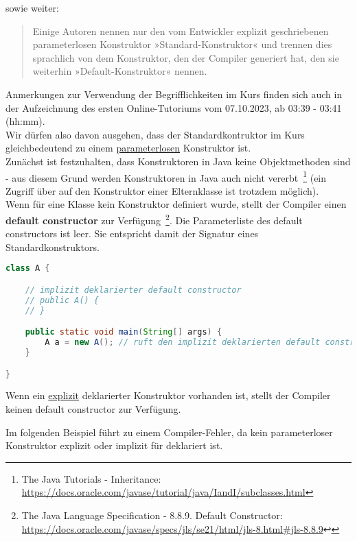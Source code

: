 sowie weiter:

\blockquote[{\cite[517]{Ull12}}]{
    Einige Autoren nennen nur den vom Entwickler explizit geschriebenen parameterlosen Konstruktor »Standard-Konstruktor«
    und trennen dies sprachlich von dem Konstruktor, den der Compiler generiert hat, den sie weiterhin »Default-Konstruktor« nennen.
}

Anmerkungen zur Verwendung der Begrifflichkeiten im Kurs finden sich auch in der Aufzeichnung des ersten Online-Tutoriums
vom 07.10.2023, ab 03:39 - 03:41 (hh:mm).\\

Wir dürfen also davon ausgehen, dass der Standardkontruktor im Kurs gleichbedeutend zu einem \underline{parameterlosen}
Konstruktor ist.\\

Zunächst ist festzuhalten, dass Konstruktoren in Java keine Objektmethoden sind - aus diesem Grund werden Konstruktoren
in Java auch nicht vererbt~\footnote{
    The Java Tutorials - Inheritance: \url{https://docs.oracle.com/javase/tutorial/java/IandI/subclasses.html}
} (ein Zugriff über  auf den Konstruktor einer Elternklasse ist trotzdem möglich).\\

Wenn für eine Klasse kein Konstruktor definiert wurde, stellt der Compiler einen \textbf{default constructor}
zur Verfügung~\footnote{
    The Java Language Specification - 8.8.9. Default Constructor: \url{https://docs.oracle.com/javase/specs/jls/se21/html/jls-8.html#jls-8.8.9}↩
}. Die Parameterliste des default constructors ist leer. Sie entspricht damit der Signatur eines Standardkonstruktors.

\begin{lstlisting}[language=java]
class A {

    // implizit deklarierter default constructor
    // public A() {
    // }

    public static void main(String[] args) {
        A a = new A(); // ruft den implizit deklarierten default constructor auf
    }

}
\end{lstlisting}

Wenn ein \underline{explizit} deklarierter Konstruktor vorhanden ist, stellt der Compiler keinen default constructor zur Verfügung.

Im folgenden Beispiel führt  zu einem Compiler-Fehler, da kein parameterloser Konstruktor explizit oder implizit für  deklariert ist.

